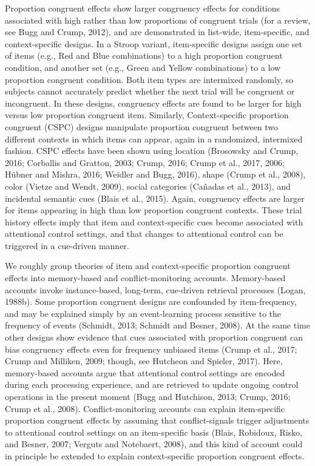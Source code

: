 \documentclass[]{DissertateCUNY}
\begin{document}
Proportion congruent effects show larger congruency effects for
conditions associated with high rather than low proportions of congruent
trials (for a review, see Bugg and Crump, 2012), and are demonstrated in
list-wide, item-specific, and context-specific designs. In a Stroop
variant, item-specific designs assign one set of items (e.g., Red and
Blue combinations) to a high proportion congruent condition, and another
set (e.g., Green and Yellow combinations) to a low proportion congruent
condition. Both item types are intermixed randomly, so subjects cannot
accurately predict whether the next trial will be congruent or
incongruent. In these designs, congruency effects are found to be larger
for high versus low proportion congruent item. Similarly,
Context-specific proportion congruent (CSPC) designs manipulate
proportion congruent between two different contexts in which items can
appear, again in a randomized, intermixed fashion. CSPC effects have
been shown using location (Brosowsky and Crump, 2016; Corballis and
Gratton, 2003; Crump, 2016; Crump et al., 2017, 2006; Hübner and Mishra,
2016; Weidler and Bugg, 2016), shape (Crump et al., 2008), color (Vietze
and Wendt, 2009), social categories (Cañadas et al., 2013), and
incidental semantic cues (Blais et al., 2015). Again, congruency effects
are larger for items appearing in high than low proportion congruent
contexts. These trial history effects imply that item and
context-specific cues become associated with attentional control
settings, and that changes to attentional control can be triggered in a
cue-driven manner.

We roughly group theories of item and context-specific proportion
congruent effects into memory-based and conflict-monitoring accounts.
Memory-based accounts invoke instance-based, long-term, cue-driven
retrieval processes (Logan, 1988b). Some proportion congruent designs
are confounded by item-frequency, and may be explained simply by an
event-learning process sensitive to the frequency of events (Schmidt,
2013; Schmidt and Besner, 2008). At the same time other designs show
evidence that cues associated with proportion congruent can bias
congruency effects even for frequency unbiased items (Crump et al.,
2017; Crump and Milliken, 2009; though, see Hutcheon and Spieler, 2017).
Here, memory-based accounts argue that attentional control settings are
encoded during each processing experience, and are retrieved to update
ongoing control operations in the present moment (Bugg and Hutchison,
2013; Crump, 2016; Crump et al., 2008). Conflict-monitoring accounts can
explain item-specific proportion congruent effects by assuming that
conflict-signals trigger adjustments to attentional control settings on
an item-specific basis (Blais, Robidoux, Risko, and Besner, 2007;
Verguts and Notebaert, 2008), and this kind of account could in
principle be extended to explain context-specific proportion congruent
effects.
\end{document}
